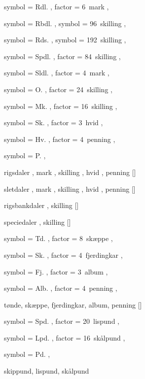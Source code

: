 
 {
	symbol = { Rdl. } ,
	factor = { 6~mark } ,
}

 {
	symbol = { Rbdl. } ,
	symbol = { 96~skilling } ,
}

 {
	symbol = { Rds. } ,
	symbol = { 192~skilling } ,
}

 {
	symbol = { Spdl. } ,
	factor = { 84~skilling } ,
}

 {
	symbol = { Sldl. } ,
	factor = { 4~mark } ,
}

 {
	symbol = { O. } ,
	factor = { 24~skilling } ,
}

 {
	symbol = { Mk. } ,
	factor = { 16~skilling } ,
}

 {
	symbol = { Sk. } ,
	factor = { 3~hvid } ,
}

 {
	symbol = { Hv. } ,
	factor = { 4~penning } ,
}

 {
	symbol = { P. } ,
}

 {
	rigsdaler ,
	mark ,
	skilling ,
	hvid ,
	penning
}[\rdl]

 {
	sletdaler ,
	mark ,
	skilling ,
	hvid ,
	penning
}[\sldl]

 {
	rigsbankdaler ,
	skilling
}[\rbdl]

 {
	speciedaler ,
	skilling
}[\spdl]


 {
	symbol = { Td. } ,
	factor = { 8~skæppe } ,
}

 {
	symbol = { Sk. } ,
	factor = { 4~fjerdingkar } ,
}

 {
	symbol = { Fj. } ,
	factor = { 3~album } ,
}

 {
	symbol = { Alb. } ,
	factor = { 4~penning } ,
}

 {
	tønde,
	skæppe,
	fjerdingkar,
	album,
	penning
}[\hartkorn]


 {
	symbol = { Spd. } ,
	factor = { 20~lispund } ,
}

 {
	symbol = { Lpd. } ,
	factor = { 16~skålpund } ,
}

 {
	symbol = { Pd. } ,
}

 {
	skippund,
	lispund,
	skålpund
}
